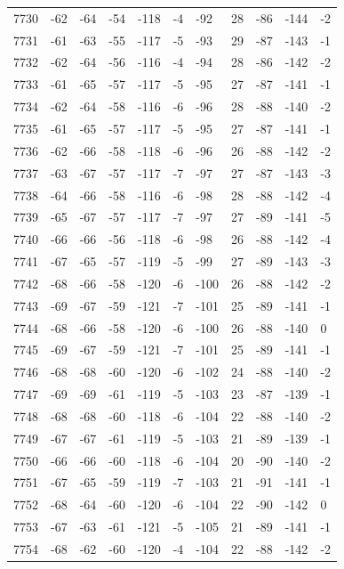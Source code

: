\begin{table}[H]
\begin{tabular}{lllllllllll}
7730 & -62 & -64 & -54 & -118 & -4 & -92 & 28 & -86 & -144 & -2 \\
7731 & -61 & -63 & -55 & -117 & -5 & -93 & 29 & -87 & -143 & -1 \\
7732 & -62 & -64 & -56 & -116 & -4 & -94 & 28 & -86 & -142 & -2 \\
7733 & -61 & -65 & -57 & -117 & -5 & -95 & 27 & -87 & -141 & -1 \\
7734 & -62 & -64 & -58 & -116 & -6 & -96 & 28 & -88 & -140 & -2 \\
7735 & -61 & -65 & -57 & -117 & -5 & -95 & 27 & -87 & -141 & -1 \\
7736 & -62 & -66 & -58 & -118 & -6 & -96 & 26 & -88 & -142 & -2 \\
7737 & -63 & -67 & -57 & -117 & -7 & -97 & 27 & -87 & -143 & -3 \\
7738 & -64 & -66 & -58 & -116 & -6 & -98 & 28 & -88 & -142 & -4 \\
7739 & -65 & -67 & -57 & -117 & -7 & -97 & 27 & -89 & -141 & -5 \\
7740 & -66 & -66 & -56 & -118 & -6 & -98 & 26 & -88 & -142 & -4 \\
7741 & -67 & -65 & -57 & -119 & -5 & -99 & 27 & -89 & -143 & -3 \\
7742 & -68 & -66 & -58 & -120 & -6 & -100 & 26 & -88 & -142 & -2 \\
7743 & -69 & -67 & -59 & -121 & -7 & -101 & 25 & -89 & -141 & -1 \\
7744 & -68 & -66 & -58 & -120 & -6 & -100 & 26 & -88 & -140 & 0 \\
7745 & -69 & -67 & -59 & -121 & -7 & -101 & 25 & -89 & -141 & -1 \\
7746 & -68 & -68 & -60 & -120 & -6 & -102 & 24 & -88 & -140 & -2 \\
7747 & -69 & -69 & -61 & -119 & -5 & -103 & 23 & -87 & -139 & -1 \\
7748 & -68 & -68 & -60 & -118 & -6 & -104 & 22 & -88 & -140 & -2 \\
7749 & -67 & -67 & -61 & -119 & -5 & -103 & 21 & -89 & -139 & -1 \\
7750 & -66 & -66 & -60 & -118 & -6 & -104 & 20 & -90 & -140 & -2 \\
7751 & -67 & -65 & -59 & -119 & -7 & -103 & 21 & -91 & -141 & -1 \\
7752 & -68 & -64 & -60 & -120 & -6 & -104 & 22 & -90 & -142 & 0 \\
7753 & -67 & -63 & -61 & -121 & -5 & -105 & 21 & -89 & -141 & -1 \\
7754 & -68 & -62 & -60 & -120 & -4 & -104 & 22 & -88 & -142 & -2 \\

\end{tabular}
\end{table}
